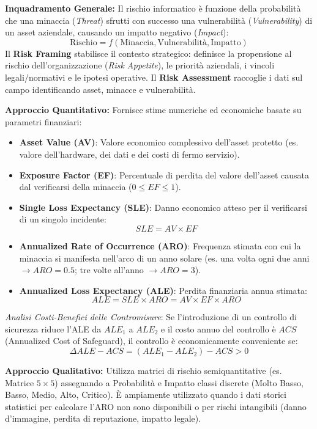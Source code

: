 \documentclass[11pt,a4paper]{article}
\begin{document}
\begin{solutionbox}
\textbf{Inquadramento Generale:}
Il rischio informatico \`e funzione della probabilit\`a che una minaccia (\textit{Threat}) sfrutti con successo una vulnerabilit\`a (\textit{Vulnerability}) di un asset aziendale, causando un impatto negativo (\textit{Impact}):
\[
\text{Rischio} = f(\text{Minaccia}, \text{Vulnerabilit\`a}, \text{Impatto})
\]
Il \textbf{Risk Framing} stabilisce il contesto strategico: definisce la propensione al rischio dell'organizzazione (\textit{Risk Appetite}), le priorit\`a aziendali, i vincoli legali/normativi e le ipotesi operative. Il \textbf{Risk Assessment} raccoglie i dati sul campo identificando asset, minacce e vulnerabilit\`a.

\textbf{Approccio Quantitativo:}
Fornisce stime numeriche ed economiche basate su parametri finanziari:
\begin{itemize}
    \item \textbf{Asset Value (AV)}: Valore economico complessivo dell'asset protetto (es. valore dell'hardware, dei dati e dei costi di fermo servizio).
    \item \textbf{Exposure Factor (EF)}: Percentuale di perdita del valore dell'asset causata dal verificarsi della minaccia ($0 \le EF \le 1$).
    \item \textbf{Single Loss Expectancy (SLE)}: Danno economico atteso per il verificarsi di un singolo incidente:
    \[
    SLE = AV \times EF
    \]
    \item \textbf{Annualized Rate of Occurrence (ARO)}: Frequenza stimata con cui la minaccia si manifesta nell'arco di un anno solare (es. una volta ogni due anni $\rightarrow ARO = 0.5$; tre volte all'anno $\rightarrow ARO = 3$).
    \item \textbf{Annualized Loss Expectancy (ALE)}: Perdita finanziaria annua stimata:
    \[
    ALE = SLE \times ARO = AV \times EF \times ARO
    \]
\end{itemize}
\textit{Analisi Costi-Benefici delle Contromisure}: Se l'introduzione di un controllo di sicurezza riduce l'ALE da $ALE_1$ a $ALE_2$ e il costo annuo del controllo \`e $ACS$ (Annualized Cost of Safeguard), il controllo \`e economicamente conveniente se:
\[
\Delta ALE - ACS = (ALE_1 - ALE_2) - ACS > 0
\]

\textbf{Approccio Qualitativo:}
Utilizza matrici di rischio semiquantitative (es. Matrice $5 \times 5$) assegnando a Probabilit\`a e Impatto classi discrete (Molto Basso, Basso, Medio, Alto, Critico). \`E ampiamente utilizzato quando i dati storici statistici per calcolare l'ARO non sono disponibili o per rischi intangibili (danno d'immagine, perdita di reputazione, impatto legale).
\end{solutionbox}
\end{document}
